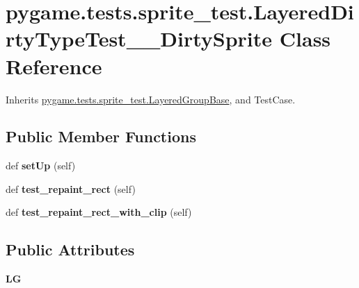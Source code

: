 \hypertarget{classpygame_1_1tests_1_1sprite__test_1_1_layered_dirty_type_test_____dirty_sprite}{}\section{pygame.\+tests.\+sprite\+\_\+test.\+Layered\+Dirty\+Type\+Test\+\_\+\+\_\+\+Dirty\+Sprite Class Reference}
\label{classpygame_1_1tests_1_1sprite__test_1_1_layered_dirty_type_test_____dirty_sprite}


Inherits \hyperlink{classpygame_1_1tests_1_1sprite__test_1_1_layered_group_base}{pygame.\+tests.\+sprite\+\_\+test.\+Layered\+Group\+Base}, and Test\+Case.

\subsection*{Public Member Functions}
\begin{DoxyCompactItemize}
\item 
\mbox{\label{classpygame_1_1tests_1_1sprite__test_1_1_layered_dirty_type_test_____dirty_sprite_aaf744eaff3a119af70757012d71922db}} 
def {\bfseries set\+Up} (self)
\item 
\mbox{\label{classpygame_1_1tests_1_1sprite__test_1_1_layered_dirty_type_test_____dirty_sprite_a140f0189c9f59e26ac46e49c82410a63}} 
def {\bfseries test\+\_\+repaint\+\_\+rect} (self)
\item 
\mbox{\label{classpygame_1_1tests_1_1sprite__test_1_1_layered_dirty_type_test_____dirty_sprite_a0cfacf3b230763cdedcc425fdbba50af}} 
def {\bfseries test\+\_\+repaint\+\_\+rect\+\_\+with\+\_\+clip} (self)
\end{DoxyCompactItemize}
\subsection*{Public Attributes}
\begin{DoxyCompactItemize}
\item 
\mbox{\label{classpygame_1_1tests_1_1sprite__test_1_1_layered_dirty_type_test_____dirty_sprite_a10efff81eb8c58c6e4d0e04ca45a671a}} 
{\bfseries LG}
\end{DoxyCompactItemize}
